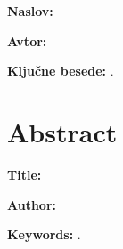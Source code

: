\noindent\textbf{Naslov:} \ttitle
\bigskip

\noindent\textbf{Avtor:} \tauthor
\bigskip

\noindent \tpovzetek

\bigskip

\noindent\textbf{Ključne besede:} \tkeywords.
\clearemptydoublepage

\chapter*{Abstract}

\noindent\textbf{Title:} \ttitleEn
\bigskip

\noindent\textbf{Author:} \tauthor
\bigskip

\noindent \tabstract
\bigskip

\newpage
\noindent\textbf{Keywords:} \tkeywordsEn.
\clearemptydoublepage